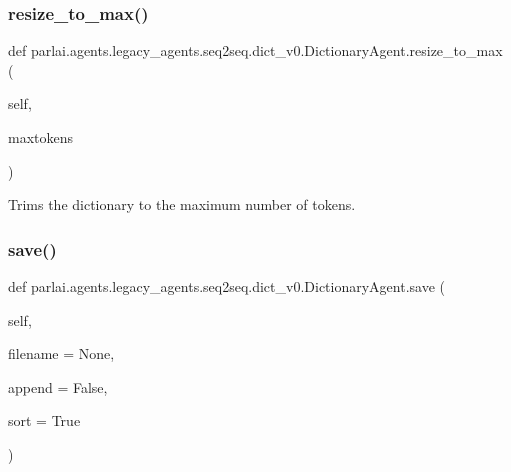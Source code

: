 \subsubsection{\texorpdfstring{resize\+\_\+to\+\_\+max()}{resize\_to\_max()}}
{\footnotesize\ttfamily def parlai.\+agents.\+legacy\+\_\+agents.\+seq2seq.\+dict\+\_\+v0.\+Dictionary\+Agent.\+resize\+\_\+to\+\_\+max (\begin{DoxyParamCaption}\item[{}]{self,  }\item[{}]{maxtokens }\end{DoxyParamCaption})}

\begin{DoxyVerb}Trims the dictionary to the maximum number of tokens.
\end{DoxyVerb}
 \mbox{\label{classparlai_1_1agents_1_1legacy__agents_1_1seq2seq_1_1dict__v0_1_1DictionaryAgent_ab2838da6f97c13b8eae241ac6db59417}} 
\subsubsection{\texorpdfstring{save()}{save()}}
{\footnotesize\ttfamily def parlai.\+agents.\+legacy\+\_\+agents.\+seq2seq.\+dict\+\_\+v0.\+Dictionary\+Agent.\+save (\begin{DoxyParamCaption}\item[{}]{self,  }\item[{}]{filename = {\ttfamily None},  }\item[{}]{append = {\ttfamily False},  }\item[{}]{sort = {\ttfamily True} }\end{DoxyParamCaption})}

